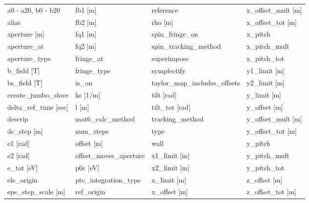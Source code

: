  \begin{tabular}{llll} \toprule
a0 - a20, b0 - b20             & fb1 [m]                        & reference                      & x_offset_mult [m]              \\
alias                          & fb2 [m]                        & rho [m]                        & x_offset_tot [m]               \\
aperture [m]                   & fq1 [m]                        & spin_fringe_on                 & x_pitch                        \\
aperture_at                    & fq2 [m]                        & spin_tracking_method           & x_pitch_mult                   \\
aperture_type                  & fringe_at                      & superimpose                    & x_pitch_tot                    \\
b_field [T]                    & fringe_type                    & symplectify                    & y1_limit [m]                   \\
bs_field [T]                   & is_on                          & taylor_map_includes_offsets    & y2_limit [m]                   \\
create_jumbo_slave             & ks [1/m]                       & tilt [rad]                     & y_limit [m]                    \\
delta_ref_time [sec]           & l [m]                          & tilt_tot [rad]                 & y_offset [m]                   \\
descrip                        & mat6_calc_method               & tracking_method                & y_offset_mult [m]              \\
ds_step [m]                    & num_steps                      & type                           & y_offset_tot [m]               \\
e1 [rad]                       & offset [m]                     & wall                           & y_pitch                        \\
e2 [rad]                       & offset_moves_aperture          & x1_limit [m]                   & y_pitch_mult                   \\
e_tot [eV]                     & p0c [eV]                       & x2_limit [m]                   & y_pitch_tot                    \\
ele_origin                     & ptc_integration_type           & x_limit [m]                    & z_offset [m]                   \\
eps_step_scale [m]             & ref_origin                     & x_offset [m]                   & z_offset_tot [m]               \\
 \bottomrule
 \end{tabular}
 \vfill
 
